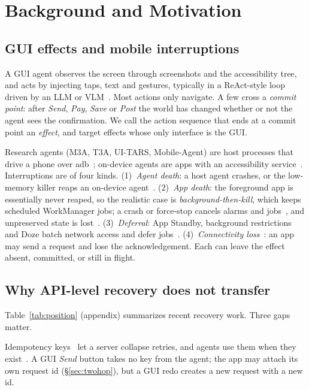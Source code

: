 \section{Background and Motivation}
\label{sec:background}

\subsection{GUI effects and mobile interruptions}
\label{sec:bg-effects}
A GUI agent observes the screen through screenshots and the accessibility tree, and acts by injecting taps, text and gestures,
typically in a ReAct-style loop driven by an LLM or VLM~\cite{yao2023react,rawles2025androidworld,qin2025uitars}. Most actions only navigate.
A few cross a \emph{commit point}: after \emph{Send}, \emph{Pay}, \emph{Save} or \emph{Post} the world has changed whether or not the agent sees the
confirmation. We call the action sequence that ends at a commit point an \emph{effect}, and target effects whose only interface is the GUI.

Research agents (M3A, T3A, UI-TARS, Mobile-Agent) are host processes that drive a phone over adb~\cite{rawles2025androidworld}; on-device agents are apps with an
accessibility service~\cite{wen2024autodroid}. Interruptions are of four kinds. (1)~\emph{Agent death}: a host agent crashes, or the low-memory killer reaps an on-device
agent~\cite{android_lmkd}. (2)~\emph{App death}: the foreground app is essentially never reaped, so the realistic case is \emph{background-then-kill}, which keeps scheduled
WorkManager jobs; a crash or force-stop cancels alarms and jobs~\cite{android_workmanager}, and unpreserved state is lost~\cite{farooq2020livedroid}. (3)~\emph{Deferral}:
App Standby, background restrictions and Doze batch network access and defer jobs~\cite{android_doze,android_standby}. (4)~\emph{Connectivity loss}~\cite{sentosa2025cellreplay}:
an app may send a request and lose the acknowledgement. Each can leave the effect absent, committed, or still in flight.

\subsection{Why API-level recovery does not transfer}
\label{sec:bg-gap}
Table~\ref{tab:position} (appendix) summarizes recent recovery work. Three gaps matter.

 Idempotency keys~\cite{stripe_idempotency,helland2012idempotence} let a server collapse retries, and agents use them when they exist~\cite{li2026exactlyonce}.
A GUI \emph{Send} button takes no key from the agent; the app may attach its own request id (\S\ref{sec:twohop}), but a GUI redo creates a new request with a new id.


